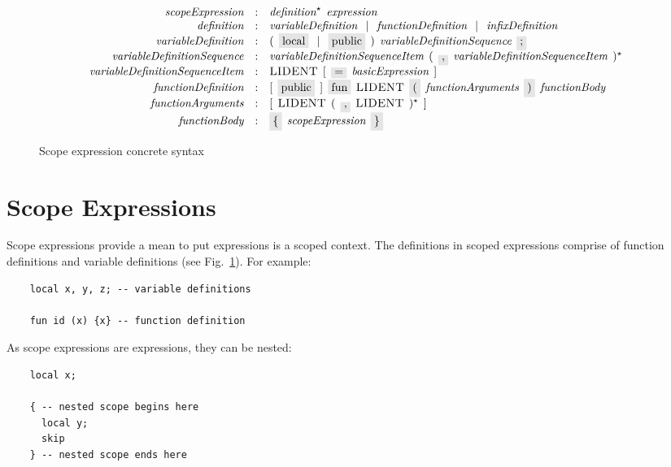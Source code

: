 \begin{figure}[t]
  \[
    \begin{array}{rcl}
      \defterm{scopeExpression}                & : & \nonterm{definition}^\star\s\nonterm{expression}\\
      \defterm{definition}                     & : & \nonterm{variableDefinition}\alt\nonterm{functionDefinition}\alt\nonterm{infixDefinition}\\
      \defterm{variableDefinition}             & : & (\s\term{local}\alt\term{public}\s)\s\nonterm{variableDefinitionSequence}\s\term{;}\\
      \defterm{variableDefinitionSequence}     & : & \nonterm{variableDefinitionSequenceItem}\s(\s\term{,}\s\nonterm{variableDefinitionSequenceItem}\s)^\star\\
      \defterm{variableDefinitionSequenceItem} & : & \token{LIDENT}\s[\s\term{=}\s\nonterm{basicExpression}\s]\\
      \defterm{functionDefinition}             & : & [\s\term{public}\s]\s\term{fun}\s\token{LIDENT}\s\term{(}\s\nonterm{functionArguments}\s\term{)}\s\nonterm{functionBody}\\
      \defterm{functionArguments}              & : & [\s\token{LIDENT}\s(\s\term{,}\s\token{LIDENT}\s)^\star\s]\\
      \defterm{functionBody}                   & : & \term{\{}\s\nonterm{scopeExpression}\s\term{\}}
    \end{array}
  \]
  \caption{Scope expression concrete syntax}
  \label{scope_expression}
\end{figure}

\section{Scope Expressions}
\label{sec:scope_expressions}

Scope expressions provide a mean to put expressions is a scoped context. The definitions in scoped expressions comprise of function definitions and
variable definitions (see Fig.~\ref{scope_expression}). For example:

\begin{lstlisting}
    local x, y, z; -- variable definitions

    fun id (x) {x} -- function definition
\end{lstlisting}

As scope expressions are expressions, they can be nested:

\begin{lstlisting}
    local x;

    { -- nested scope begins here
      local y;
      skip
    } -- nested scope ends here
\end{lstlisting}

